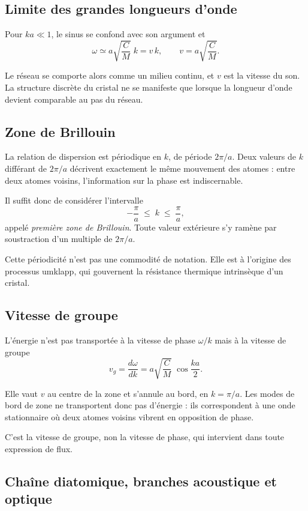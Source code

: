 \documentclass[11pt,a4paper]{article}
\begin{document}
\subsection{Limite des grandes longueurs d'onde}

Pour $ka \ll 1$, le sinus se confond avec son argument et
\[ \omega \simeq a\sqrt{\frac{C}{M}}\;k = v\,k , \qquad v = a\sqrt{\frac{C}{M}} . \]

Le réseau se comporte alors comme un milieu continu, et $v$ est la vitesse du son. La structure
discrète du cristal ne se manifeste que lorsque la longueur d'onde devient comparable au pas du
réseau.

\subsection{Zone de Brillouin}

La relation de dispersion est périodique en $k$, de période $2\pi/a$. Deux valeurs de $k$ différant
de $2\pi/a$ décrivent exactement le même mouvement des atomes : entre deux atomes voisins,
l'information sur la phase est indiscernable.

Il suffit donc de considérer l'intervalle
\[ -\frac{\pi}{a} \;\le\; k \;\le\; \frac{\pi}{a} , \]
appelé \emph{première zone de Brillouin}. Toute valeur extérieure s'y ramène par soustraction d'un
multiple de $2\pi/a$.

Cette périodicité n'est pas une commodité de notation. Elle est à l'origine des processus umklapp,
qui gouvernent la résistance thermique intrinsèque d'un cristal.

\subsection{Vitesse de groupe}

L'énergie n'est pas transportée à la vitesse de phase $\omega/k$ mais à la vitesse de groupe
\[ v_g = \frac{d\omega}{dk} = a\sqrt{\frac{C}{M}}\;\cos\frac{ka}{2} . \]

Elle vaut $v$ au centre de la zone et s'annule au bord, en $k = \pi/a$. Les modes de bord de zone
ne transportent donc pas d'énergie : ils correspondent à une onde stationnaire où deux atomes
voisins vibrent en opposition de phase.

C'est la vitesse de groupe, non la vitesse de phase, qui intervient dans toute expression de flux.

\subsection{Chaîne diatomique, branches acoustique et optique}
\end{document}
